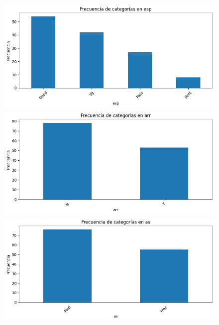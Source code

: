 \documentclass[11pt,a4paper]{article}
\begin{document}
\begin{figure}[H]
  \medskip

  \begin{minipage}{0.32\textwidth}
    \includegraphics[width=\linewidth]{img/frecuencia_esp.png}
  \end{minipage}
  \hfill
  \begin{minipage}{0.32\textwidth}
    \includegraphics[width=\linewidth]{img/frecuencia_arr.png}
  \end{minipage}
  \hfill
  \begin{minipage}{0.32\textwidth}
    \includegraphics[width=\linewidth]{img/frecuencia_as.png}
  \end{minipage}


\end{figure}
\end{document}
